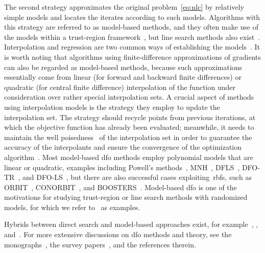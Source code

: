 \documentclass[11pt,draft]{article}
\numberwithin{equation}{section}
\def\boosters{\mbox{BOOSTERS}}
\def\conorbit{\mbox{CONORBIT}}
\def\orbit{\mbox{ORBIT}}
\begin{document}
The second strategy approximates the original problem~\eqref{eq:nlc} by relatively simple models and locates the iterates according to such models.
Algorithms with this strategy are referred to as model-based methods, and they often make use of the
models within a trust-region
framework~\cite{Conn_Gould_Toint_2000,Conn_Scheinberg_Vicente_2009a,Yuan_2015}, but
line search methods also exist~\cite{Berahas_Byrd_Nocedal_2019,Shi_Etal_2021}.
Interpolation and regression are two common ways of establishing the
models~\cite{Powell_2001,Powell_2004a,Conn_Scheinberg_Vicente_2008a,Conn_Scheinberg_Vicente_2008a,Wild_Regis_Shoemaker_2008,Bandeira_Scheinberg_Vicente_2012,Billups_Larson_Graf_2013,Regis_Wild_2017}.
It is worth noting that algorithms using finite-difference approximations of gradients can also be
regarded as model-based methods, because such approximations essentially come from linear (for
forward and backward finite differences) or quadratic (for central finite difference) interpolation
of the function under consideration over rather special interpolation sets.
A crucial aspect of methods using interpolation models is the strategy
they employ to update the interpolation set.
The strategy should recycle points from previous iterations, at which the objective function has already been
evaluated; meanwhile, it needs to maintain the well
poisedness~\cite{Sauer_Xu_1995,Conn_Scheinberg_Vicente_2009b} of
the interpolation set in order to guarantee the accuracy of the interpolants
and ensure the convergence of the optimization algorithm~\cite{Conn_Scheinberg_Vicente_2008a,Conn_Scheinberg_Vicente_2008b,
Fasano_Morales_Nocedal_2009,Scheinberg_Toint_2010}.
Most model-based \gls{dfo} methods employ polynomial models that are linear or
quadratic, examples including
Powell's methods~\cite{Powell_1994,Powell_2002,Powell_2006,Powell_2009,Powell_2015},
MNH~\cite{Wild_2008}, DFLS~\cite{Zhang_Conn_Scheinberg_2010},
\mbox{DFO-TR}~\cite{Bandeira_Scheinberg_Vicente_2012},
and \mbox{DFO-LS}~\cite{Cartis_Etal_2019},
but there are also successful cases exploiting~\glspl{rbf},
such as \orbit~\cite{Wild_Regis_Shoemaker_2008},
\conorbit~\cite{Regis_Wild_2017}, and \boosters~\cite{Oeuvray_Bierlaire_2009}. Model-based
\gls{dfo} is one of the motivations for studying trust-region or line search methods with
randomized models, for which we refer
to~\cite{Bandeira_Scheinberg_Vicente_2014,Gratton_Etal_2018,Cartis_Scheinberg_2018} as examples.

Hybrids between direct search and model-based approaches exist, for example~\cite{Custodio_Vicente_2007}, \cite[Algorithm~4.7]{Kelley_2011}, and~\cite{Conn_Digabel_2013}. For more extensive discussions on \gls{dfo} methods and theory, see the monographs~\cite{Conn_Scheinberg_Vicente_2009b,Audet_Hare_2017}, the survey papers~\cite{Rios_Sahinidis_2013, Custodio_Scheinberg_Vicente_2017, Larson_Menickelly_Wild_2019}, and the references therein.
\end{document}
